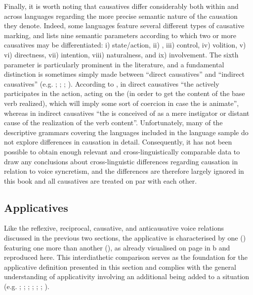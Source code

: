 Finally, it is worth noting that causatives differ considerably both within and across languages regarding the more precise semantic nature of the causation they denote. Indeed, some languages feature several different types of causative marking, and \citet[62]{dixon:2000} lists nine semantic parameters according to which two or more causatives may be differentiated: i) state/action, ii) , iii) control, iv) volition, v)  vi) directness, vii) intention, viii) naturalness, and ix) involvement. The sixth parameter is particularly prominent in the literature, and a fundamental distinction is sometimes simply made between “direct causatives” and “indirect causatives” (e.g. \citealt[171]{comrie:1989}; \citealt[892]{kulikov:2001}; \citealt{shibatani:pardeshi:2002}; \citealt[34ff.]{zuniga:kittila:2019}). According to \citet[1138]{haspelmath:muller-bardey:2004}, in direct causatives “the  actively participates in the action, acting on the  (in order to get the content of the base verb realized), which will imply some sort of coercion in case the  is animate”, whereas in indirect causatives “the  is conceived of as a mere instigator or distant cause of the realization of the verb content”. Unfortunately, many of the descriptive grammars covering the languages included in the language sample do not explore differences in causation in detail. Consequently, it has not been possible to obtain enough relevant and cross-linguistically comparable data to draw any conclusions about cross-linguistic differences regarding causation in relation to voice syncretism, and the differences are therefore largely ignored in this book and all causatives are treated on par with each other.

\largerpage
\subsection{Applicatives} \label{def:applicatives}\label{sec:applicatives}
Like the reflexive, reciprocal, causative, and anticausative voice relations discussed in the previous two sections, the applicative  is characterised by one  () featuring one  more than another  (), as already visualised on page \pageref{fig:ch2:diathetic-relations} in b and reproduced here. This interdiathetic comparison serves as the foundation for the applicative definition presented in this section and complies with the general understanding of applicativity involving an additional  being added to a situation (e.g. \citealt[144f.]{kazenin:1994}; \citealt[31]{dixon:2000}; \citealt[13f.]{dixon:aikhenvald:2000}; \citealt[389]{kulikov:2010}; \citealt[90, 96]{malchukov:2015}; \citeyear[413]{malchukov:2016}; \citealt[47]{zuniga:kittila:2019}).

